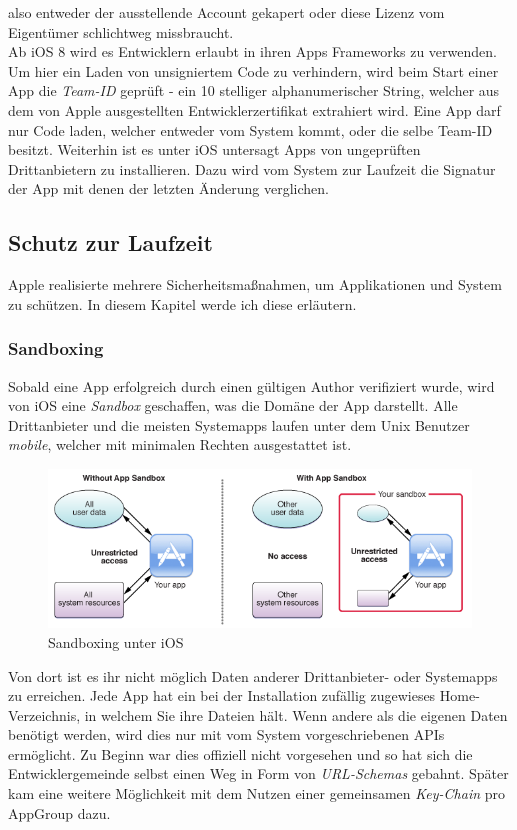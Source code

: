 		also entweder der ausstellende Account gekapert oder diese Lizenz vom
		Eigentümer schlichtweg missbraucht.\\
		Ab iOS 8 wird es Entwicklern erlaubt in ihren Apps Frameworks zu verwenden. Um
		hier ein Laden von unsigniertem Code zu verhindern, wird beim Start einer App
		die \textsl{Team-ID} geprüft - ein 10 stelliger alphanumerischer String,
		welcher aus dem von Apple ausgestellten Entwicklerzertifikat extrahiert wird.
		Eine App darf nur Code laden, welcher entweder vom System kommt, oder die selbe
		Team-ID besitzt. Weiterhin ist es unter iOS untersagt Apps von ungeprüften
		Drittanbietern zu installieren. Dazu wird vom System zur Laufzeit die
		Signatur der App mit denen der letzten Änderung verglichen.
		
	\subsection{Schutz zur Laufzeit}
		Apple realisierte mehrere Sicherheitsmaßnahmen, um Applikationen und System zu
		schützen. In diesem Kapitel werde ich diese erläutern.
		
		\subsubsection{Sandboxing} 
			Sobald eine App erfolgreich durch einen gültigen Author verifiziert wurde,
			wird von iOS eine \textsl{Sandbox} geschaffen, was die Domäne der App
			darstellt. Alle Drittanbieter und die meisten Systemapps laufen unter dem
			Unix Benutzer \textsl{mobile}, welcher mit minimalen Rechten ausgestattet
			ist.
			\begin{figure}[h]
				\centering
				\includegraphics[width=0.9\linewidth]{ios/media/sandboxing.png}
				\caption{Sandboxing unter iOS \cite{IOSSandboxing}}
				\label{fig:sandboxing}
			\end{figure}
			Von dort ist es ihr nicht möglich Daten anderer Drittanbieter- oder
			Systemapps zu erreichen. Jede App hat ein bei der Installation zufällig
			zugewieses Home-Verzeichnis, in welchem Sie ihre Dateien hält. Wenn
			andere als die eigenen Daten benötigt werden, wird dies nur mit vom System
			vorgeschriebenen APIs ermöglicht. Zu Beginn war dies offiziell nicht
			vorgesehen und so hat sich die Entwicklergemeinde selbst einen Weg in Form von
			\textsl{URL-Schemas} gebahnt. Später kam eine weitere Möglichkeit mit dem
			Nutzen einer gemeinsamen \textsl{Key-Chain} pro AppGroup
			dazu\cite[S.83]{Banks2015}.\\%
				

